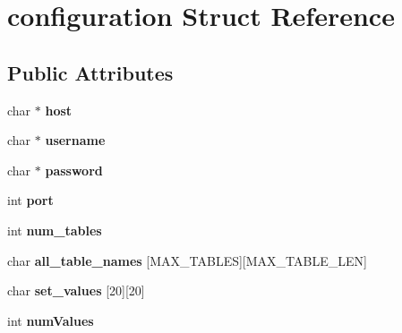 \hypertarget{structconfiguration}{
\section{configuration Struct Reference}
\label{structconfiguration}
}
\subsection*{Public Attributes}
\begin{DoxyCompactItemize}
\item 
\hypertarget{structconfiguration_aa75eac2b632684102dbe7f53c47a3ef0}{
char $\ast$ {\bfseries host}}
\label{structconfiguration_aa75eac2b632684102dbe7f53c47a3ef0}

\item 
\hypertarget{structconfiguration_a6831acd766b7c8ecedb2bb995956f58f}{
char $\ast$ {\bfseries username}}
\label{structconfiguration_a6831acd766b7c8ecedb2bb995956f58f}

\item 
\hypertarget{structconfiguration_adb7960c333b2b6c4ad6967ae1dcbd8d0}{
char $\ast$ {\bfseries password}}
\label{structconfiguration_adb7960c333b2b6c4ad6967ae1dcbd8d0}

\item 
\hypertarget{structconfiguration_a3f66b5ac4a31c99fca0743748e14efd9}{
int {\bfseries port}}
\label{structconfiguration_a3f66b5ac4a31c99fca0743748e14efd9}

\item 
\hypertarget{structconfiguration_ad26a39acd27fccdc3da45285ae8d0f27}{
int {\bfseries num\_\-tables}}
\label{structconfiguration_ad26a39acd27fccdc3da45285ae8d0f27}

\item 
\hypertarget{structconfiguration_a88bb3a2eeda2f2f1710882e6094c6be2}{
char {\bfseries all\_\-table\_\-names} \mbox{[}MAX\_\-TABLES\mbox{]}\mbox{[}MAX\_\-TABLE\_\-LEN\mbox{]}}
\label{structconfiguration_a88bb3a2eeda2f2f1710882e6094c6be2}

\item 
\hypertarget{structconfiguration_a72ed1b601b163cd238ca2a363e739f2c}{
char {\bfseries set\_\-values} \mbox{[}20\mbox{]}\mbox{[}20\mbox{]}}
\label{structconfiguration_a72ed1b601b163cd238ca2a363e739f2c}

\item 
\hypertarget{structconfiguration_afa97910d14e105d20173208e0a147079}{
int {\bfseries numValues}}
\label{structconfiguration_afa97910d14e105d20173208e0a147079}


\end{DoxyCompactItemize}
